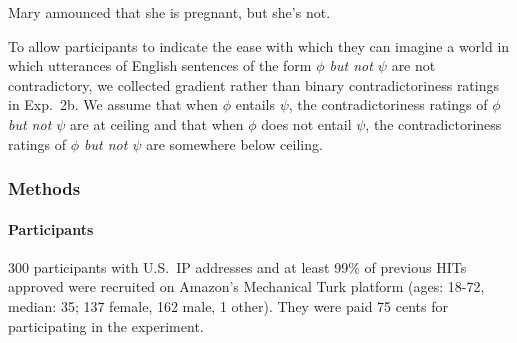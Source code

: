 \documentclass[11pt,fleqn]{article}
\newcommand{\6}{\mbox{$[\hspace*{-.6mm}[$}}
\newcommand{\9}{\mbox{$]\hspace*{-.6mm}]$}}
\begin{document}
\begin{exe}
\ex\label{announce3} Mary announced that she is pregnant, but she's not.
\end{exe}
To allow participants to indicate the ease with which they can imagine a world in which utterances of English sentences of the form {\em $\phi$ but not $\psi$}  are not contradictory, we collected gradient rather than binary contradictoriness ratings in Exp.~2b. We assume that when $\phi$ entails $\psi$, the contradictoriness ratings of {\em $\phi$ but not $\psi$} are at ceiling and that when $\phi$ does not entail $\psi$, the contradictoriness ratings of {\em $\phi$ but not $\psi$} are somewhere below ceiling.

\subsubsection{Methods}

\paragraph{Participants} 300 participants with U.S.\ IP addresses and at least 99\% of previous HITs approved were recruited on Amazon's Mechanical Turk platform (ages: 18-72, median: 35; 137 female, 162 male, 1 other). They were paid 75 cents for participating in the experiment.
\end{document}
